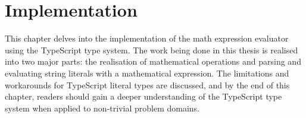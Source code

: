 \chapter{Implementation}

This chapter delves into the implementation of the math expression evaluator using the TypeScript type system. The work being done in this thesis is realised into two major parts: the realisation of mathematical operations and parsing and evaluating string literals with a mathematical expression. The limitations and workarounds for TypeScript literal types are discussed, and by the end of this chapter, readers should gain a deeper understanding of the TypeScript type system when applied to non-trivial problem domains.





\clearpage











